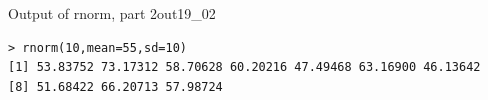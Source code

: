 \begin{Rscreen}{Output of rnorm, part 2}{out19_02}
	\begin{verbatim}
> rnorm(10,mean=55,sd=10)
[1] 53.83752 73.17312 58.70628 60.20216 47.49468 63.16900 46.13642 
[8] 51.68422 66.20713 57.98724
\end{verbatim}
\end{Rscreen}
